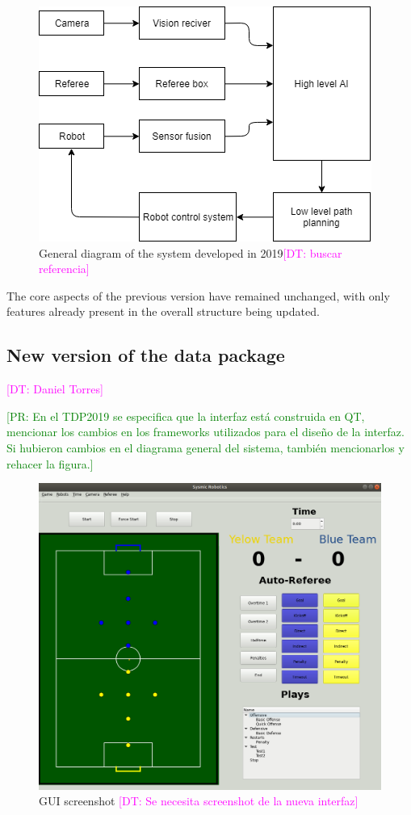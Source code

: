 \documentclass{llncs}
\newcommand{\PR}[1]{{\textcolor{green}{[PR: #1]}}}  %
\newcommand{\DT}[1]{{\textcolor{magenta}{[DT: #1]}}}%
\begin{document}
\begin{figure}[H]
    \centering
    \includegraphics[scale=0.5]{gDiagram.png}
    \caption{General diagram of the system developed in 2019\DT{buscar referencia}}
    \label{fig:gDiagram}
\end{figure}

The core aspects of the previous version have remained unchanged, with only features already present in the overall structure being updated.

\subsection{New version of the data package}
\DT{Daniel Torres}

\PR{En el TDP2019 se especifica que la interfaz está construida en QT, mencionar los cambios en los frameworks utilizados para el diseño de la interfaz. Si hubieron cambios en el diagrama general del sistema, también mencionarlos y rehacer la figura.}


\begin{figure}[H]
    \centering
    \includegraphics[scale=0.4]{GUI_F.png}
    \caption{GUI screenshot \DT{Se necesita screenshot de la nueva interfaz}}
    \label{fig:GUI}
\end{figure}
\end{document}
